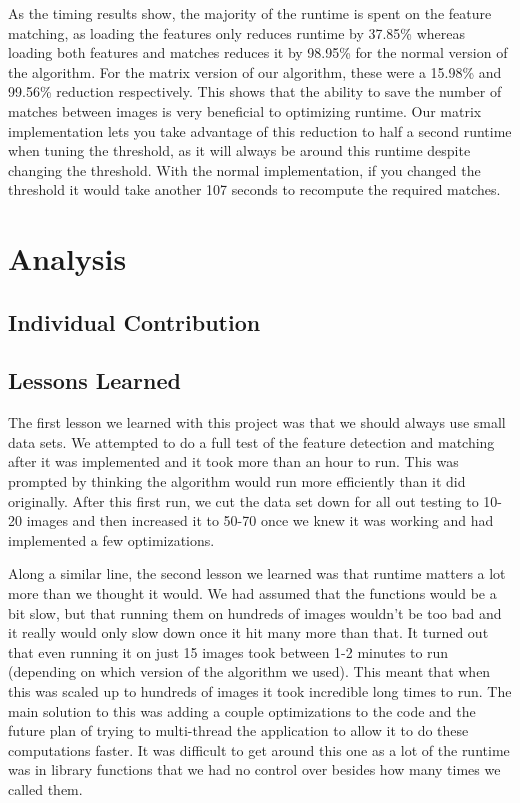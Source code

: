 \documentclass[12pt]{article}
\begin{document}
	As the timing results show, the majority of the runtime is spent on the feature matching, as loading the features only reduces runtime by 37.85\% whereas loading both features and matches reduces it by 98.95\% for the normal version of the algorithm. For the matrix version of our algorithm, these were a 15.98\% and 99.56\% reduction respectively. This shows that the ability to save the number of matches between images is very beneficial to optimizing runtime. Our matrix implementation lets you take advantage of this reduction to half a second runtime when tuning the threshold, as it will always be around this runtime despite changing the threshold. With the normal implementation, if you changed the threshold it would take another 107 seconds to recompute the required matches.


\section{Analysis}

\subsection{Individual Contribution}
	

\subsection{Lessons Learned}
	The first lesson we learned with this project was that we should always use small data sets. We attempted to do a full test of the feature detection and matching after it was implemented and it took more than an hour to run. This was prompted by thinking the algorithm would run more efficiently than it did originally. After this first run, we cut the data set down for all out testing to 10-20 images and then increased it to 50-70 once we knew it was working and had implemented a few optimizations.
	
	Along a similar line, the second lesson we learned was that runtime matters a lot more than we thought it would. We had assumed that the functions would be a bit slow, but that running them on hundreds of images wouldn't be too bad and it really would only slow down once it hit many more than that. It turned out that even running it on just 15 images took between 1-2 minutes to run (depending on which version of the algorithm we used). This meant that when this was scaled up to hundreds of images it took incredible long times to run. The main solution to this was adding a couple optimizations to the code and the future plan of trying to multi-thread the application to allow it to do these computations faster. It was difficult to get around this one as a lot of the runtime was in library functions that we had no control over besides how many times we called them.
	
\end{document}
